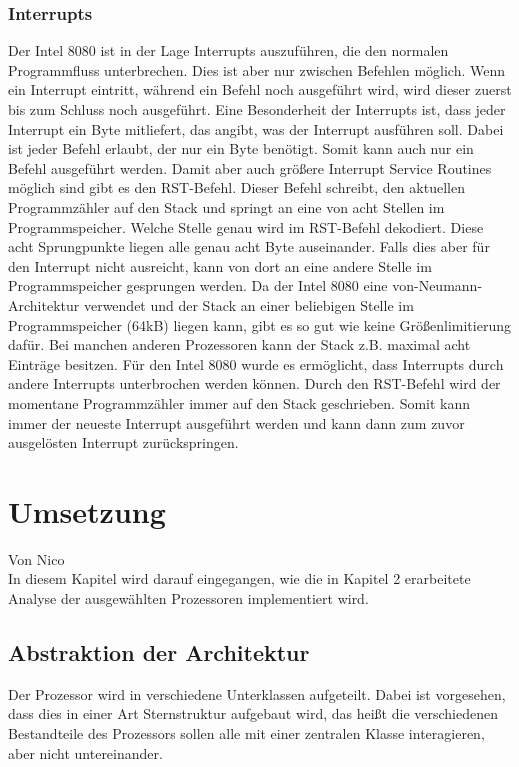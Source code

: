 \documentclass[12pt]{article}
\begin{document}
\subsubsection{Interrupts}
Der Intel 8080 ist in der Lage Interrupts auszuführen, die den normalen Programmfluss unterbrechen. Dies ist aber nur zwischen Befehlen möglich. Wenn ein Interrupt eintritt, während ein Befehl noch ausgeführt wird, wird dieser zuerst bis zum Schluss noch ausgeführt. Eine Besonderheit der Interrupts ist, dass jeder Interrupt ein Byte mitliefert, das angibt, was der Interrupt ausführen soll. Dabei ist jeder Befehl erlaubt, der nur ein Byte benötigt. Somit kann auch nur ein Befehl ausgeführt werden. Damit aber auch größere Interrupt Service Routines möglich sind gibt es den RST-Befehl. Dieser Befehl schreibt, den aktuellen Programmzähler auf den Stack und springt an eine von acht Stellen im Programmspeicher. Welche Stelle genau wird im RST-Befehl dekodiert. Diese acht Sprungpunkte liegen alle genau acht Byte auseinander. Falls dies aber für den Interrupt nicht ausreicht, kann von dort an eine andere Stelle im Programmspeicher gesprungen werden. Da der Intel 8080 eine von-Neumann-Architektur verwendet und der Stack an einer beliebigen Stelle im Programmspeicher (64kB) liegen kann, gibt es so gut wie keine Größenlimitierung dafür. Bei manchen anderen Prozessoren kann der Stack z.B. maximal acht Einträge besitzen. Für den Intel 8080 wurde es ermöglicht, dass Interrupts durch andere Interrupts unterbrochen werden können. Durch den RST-Befehl wird der momentane Programmzähler immer auf den Stack geschrieben. Somit kann immer der neueste Interrupt ausgeführt werden und kann dann zum zuvor ausgelösten Interrupt zurückspringen.


\newpage

\section{Umsetzung}
Von Nico\\

\noindent
In diesem Kapitel wird darauf eingegangen, wie die in Kapitel 2 erarbeitete Analyse der ausgewählten Prozessoren implementiert wird.

\subsection{Abstraktion der Architektur}
Der Prozessor wird in verschiedene Unterklassen aufgeteilt. Dabei ist vorgesehen, dass dies in einer Art Sternstruktur aufgebaut wird, das heißt die verschiedenen Bestandteile des Prozessors sollen alle mit einer zentralen Klasse interagieren, aber nicht untereinander.
\end{document}
